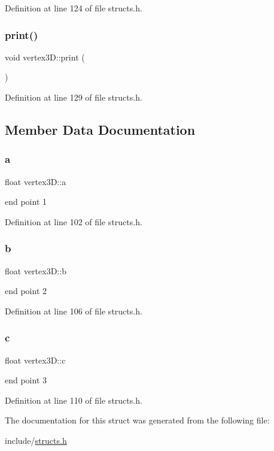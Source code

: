 Definition at line 124 of file structs.\+h.

\mbox{\label{structvertex3_d_aef60c9e545fe7ee4b2fa0a51d34948d4}} 
\subsubsection{\texorpdfstring{print()}{print()}}
{\footnotesize\ttfamily void vertex3\+D\+::print (\begin{DoxyParamCaption}{ }\end{DoxyParamCaption})\hspace{0.3cm}{\ttfamily [inline]}}



Definition at line 129 of file structs.\+h.



\subsection{Member Data Documentation}
\mbox{\label{structvertex3_d_a40127b37210f1330f6211c904a5200a9}} 
\subsubsection{\texorpdfstring{a}{a}}
{\footnotesize\ttfamily float vertex3\+D\+::a}

end point 1 

Definition at line 102 of file structs.\+h.

\mbox{\label{structvertex3_d_a5464fcdf103f44a0276a16227f9ba76c}} 
\subsubsection{\texorpdfstring{b}{b}}
{\footnotesize\ttfamily float vertex3\+D\+::b}

end point 2 

Definition at line 106 of file structs.\+h.

\mbox{\label{structvertex3_d_af706a01fa9e30bbd5e05b36ec2c42274}} 
\subsubsection{\texorpdfstring{c}{c}}
{\footnotesize\ttfamily float vertex3\+D\+::c}

end point 3 

Definition at line 110 of file structs.\+h.



The documentation for this struct was generated from the following file\+:\begin{DoxyCompactItemize}
\item 
include/\mbox{\hyperlink{structs_8h}{structs.\+h}}\end{DoxyCompactItemize}
